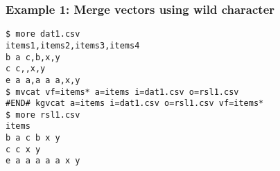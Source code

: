 \subsubsection*{Example 1: Merge vectors using wild character}



\begin{Verbatim}[baselinestretch=0.7,frame=single]
$ more dat1.csv
items1,items2,items3,items4
b a c,b,x,y
c c,,x,y
e a a,a a a,x,y
$ mvcat vf=items* a=items i=dat1.csv o=rsl1.csv
#END# kgvcat a=items i=dat1.csv o=rsl1.csv vf=items*
$ more rsl1.csv
items
b a c b x y
c c x y
e a a a a a x y
\end{Verbatim}
